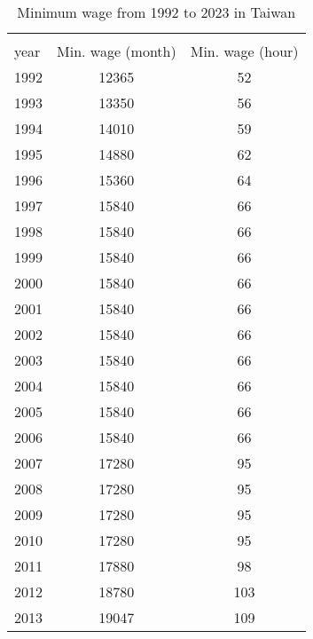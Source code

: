 \begin{table}[htbp]\centering
\def\sym#1{\ifmmode^{#1}\else\(^{#1}\)\fi}
\caption{Minimum wage from 1992 to 2023 in Taiwan\label{tab:minw}}
\begin{tabular}{l*{1}{cc}}
\hline\hline
                              &\multicolumn{2}{c}{}     \\
year                          &Min. wage (month)&Min. wage (hour)\\
\hline
1992                          &       12365&          52\\
1993                          &       13350&          56\\
1994                          &       14010&          59\\
1995                          &       14880&          62\\
1996                          &       15360&          64\\
1997                          &       15840&          66\\
1998                          &       15840&          66\\
1999                          &       15840&          66\\
2000                          &       15840&          66\\
2001                          &       15840&          66\\
2002                          &       15840&          66\\
2003                          &       15840&          66\\
2004                          &       15840&          66\\
2005                          &       15840&          66\\
2006                          &       15840&          66\\
2007                          &       17280&          95\\
2008                          &       17280&          95\\
2009                          &       17280&          95\\
2010                          &       17280&          95\\
2011                          &       17880&          98\\
2012                          &       18780&         103\\
2013                          &       19047&         109\\

\end{tabular}
\end{table}
